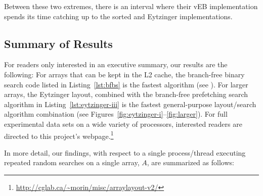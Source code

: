 \documentclass{patmorin}
\newcommand{\lstref}[1]{Listing~\ref{lst:#1}}
\begin{document}
Between these two extremes, there is an interval where their vEB
implementation spends its time catching up to the sorted and Eytzinger
implementations.


\subsection{Summary of Results}

For readers only interested in an executive summary, our results
are the following: For arrays that can be kept in the L2 cache,
the branch-free binary search code listed in \lstref{bfbs} is
the fastest algorithm (see ).  For larger
arrays, the Eytzinger layout, combined with the branch-free
prefetching search algorithm in \lstref{eytzinger-iii} is the
fastest general-purpose layout/search algorithm combination
(see Figures~\ref{fig:eytzinger-i}--\ref{fig:larger}).
For full experimental data sets on a wide variety of processors,
interested readers are directed to this project's
webpage.\footnote{\url{http://cglab.ca/~morin/misc/arraylayout-v2/}}

In more detail, our findings, with respect to a single process/thread
executing repeated random searches on a single array, $A$, are summarized
as follows:
\end{document}

